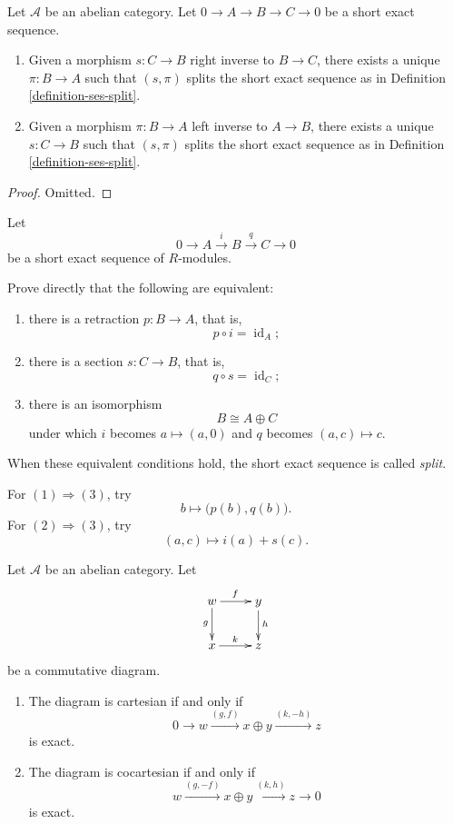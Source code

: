 \begin{lemma}
\label{lemma-ses-split}
Let $\mathcal{A}$ be an abelian category.
Let $0 \to A \to B \to C \to 0$
be a short exact sequence.
\begin{enumerate}
\item Given a morphism $s : C \to B$ right
inverse to
$B \to C$, there exists a unique $\pi : B \to
A$
such that $(s, \pi)$ splits the short exact
sequence
as in Definition \ref{definition-ses-split}.
\item Given a morphism $\pi : B \to A$ left
inverse to
$A \to B$, there exists a unique $s : C \to
B$
such that $(s, \pi)$ splits the short exact
sequence
as in Definition \ref{definition-ses-split}.
\end{enumerate}
\end{lemma}

\begin{proof}
Omitted.
\end{proof}

\begin{exercise}
\label{exercise-split-short-exact-sequence-modules}
Let
$$
0\longrightarrow A\xrightarrow{i}B\xrightarrow{q}C\longrightarrow0
$$
be a short exact sequence of $R$-modules.
\begin{reference}
\cite[Algebraic Topology, p.~147, Splitting Lemma]{Hatcher-algebraic-topology}
\end{reference}
Prove directly that the following are equivalent:
\begin{enumerate}
\item there is a retraction $p:B\to A$, that is,
$$
p\circ i=\operatorname{id}_A;
$$
\item there is a section $s:C\to B$, that is,
$$
q\circ s=\operatorname{id}_C;
$$
\item there is an isomorphism
$$
B\cong A\oplus C
$$
under which $i$ becomes $a\mapsto(a,0)$ and $q$ becomes $(a,c)\mapsto c$.
\end{enumerate}
When these equivalent conditions hold, the short exact sequence is called \emph{split}.

For $(1)\Rightarrow(3)$, try
$$
b\longmapsto\bigl(p(b),q(b)\bigr).
$$
For $(2)\Rightarrow(3)$, try
$$
(a,c)\longmapsto i(a)+s(c).
$$
\end{exercise}

\begin{lemma}
\label{lemma-characterize-cartesian}
Let $\mathcal{A}$ be an abelian category. Let
$$
\xymatrix{
w\ar[r]^f\ar[d]_g
& y\ar[d]^h\\
x\ar[r]^k
& z
}
$$
be a commutative diagram.
\begin{enumerate}
\item The diagram is cartesian if and only if
$$
0 \to w \xrightarrow{(g, f)} x \oplus y
\xrightarrow{(k, -h)} z
$$
is exact.
\item The diagram is cocartesian if and only
if
$$
w \xrightarrow{(g, -f)} x \oplus y
\xrightarrow{(k, h)} z \to 0
$$
is exact.
\end{enumerate}
\end{lemma}


